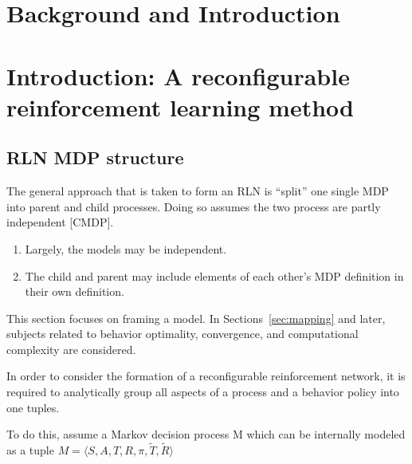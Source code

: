 \section{Background and Introduction}
\label{sec:intro}  

\section*{Introduction: A reconfigurable reinforcement learning method}

\subsection{RLN MDP structure}
\label{sec:rlnmdpstructure}

The general approach that is taken to form an RLN is ``split'' one single MDP into parent and child processes. Doing so assumes the two process are partly independent [CMDP]. 

\begin{enumerate}[label=\arabic*.]
\item Largely, the models may be independent.
\item The child and parent may include elements of each other's MDP definition in their own definition.
\end{enumerate}

This section focuses on framing a model. In Sections~\ref{sec:mapping} and later, subjects related to behavior optimality, convergence, and computational complexity are considered.

In order to consider the formation of a reconfigurable reinforcement network, it is required to analytically group all aspects of a process and a behavior policy into one tuples.

\begin{center}
\end{center}

To do this, assume a Markov decision process M which can be internally modeled as a tuple \( M = \langle S, A, T, R, \pi, \tilde{T}, \tilde{R}\rangle \)\\

